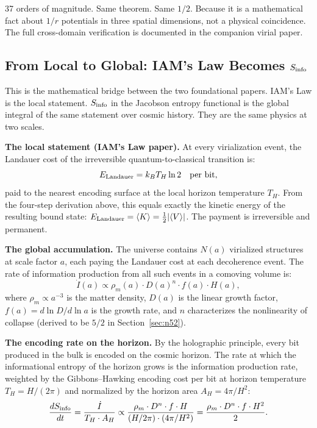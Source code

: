 \documentclass[12pt,a4paper]{article}
\begin{document}
37 orders of magnitude. Same theorem. Same $1/2$. Because it is a mathematical
fact about $1/r$ potentials in three spatial dimensions, not a physical coincidence.
The full cross-domain verification is documented in the companion virial paper.

\subsection{From Local to Global: IAM's Law Becomes $S_{\rm info}$}
\label{sec:local_to_global}

This is the mathematical bridge between the two foundational papers.
IAM's Law is the local statement. $S_{\rm info}$ in the Jacobson entropy
functional is the global integral of the same statement over cosmic history.
They are the same physics at two scales.

\textbf{The local statement (IAM's Law paper).}
At every virialization event, the Landauer cost of the irreversible
quantum-to-classical transition is:
\begin{equation}
E_{\rm Landauer} = k_B T_H \ln 2 \quad \text{per bit},
\end{equation}
paid to the nearest encoding surface at the local horizon temperature $T_H$.
From the four-step derivation above, this equals exactly the kinetic energy
of the resulting bound state: $E_{\rm Landauer} = \langle K \rangle
= \frac{1}{2}|\langle V \rangle|$. The payment is irreversible and permanent.

\textbf{The global accumulation.}
The universe contains $N(a)$ virialized structures at scale factor $a$,
each paying the Landauer cost at each decoherence event. The rate of
information production from all such events in a comoving volume is:
\begin{equation}
\dot{I}(a) \propto \rho_m(a) \cdot D(a)^n \cdot f(a) \cdot H(a),
\label{eq:Idot_bridge}
\end{equation}
where $\rho_m \propto a^{-3}$ is the matter density, $D(a)$ is the
linear growth factor, $f(a) = d\ln D/d\ln a$ is the growth rate, and $n$
characterizes the nonlinearity of collapse (derived to be $5/2$ in
Section~\ref{sec:n52}).

\textbf{The encoding rate on the horizon.}
By the holographic principle, every bit produced in the bulk is encoded
on the cosmic horizon. The rate at which the informational entropy of the
horizon grows is the information production rate, weighted by the
Gibbons--Hawking encoding cost per bit at horizon temperature
$T_H = H/(2\pi)$ and normalized by the horizon area $A_H = 4\pi/H^2$:
\begin{equation}
\frac{dS_{\rm info}}{dt} = \frac{\dot{I}}{T_H \cdot A_H}
\propto \frac{\rho_m \cdot D^n \cdot f \cdot H}{(H/2\pi) \cdot (4\pi/H^2)}
= \frac{\rho_m \cdot D^n \cdot f \cdot H^2}{2}.
\label{eq:dSinfo_bridge}
\end{equation}
\end{document}
